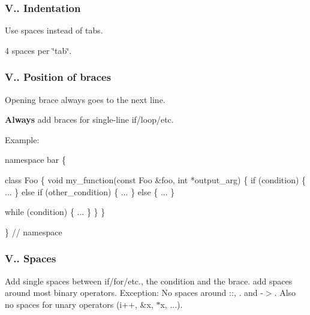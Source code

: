 \subsubsection*{V.. Indentation}


\begin{DoxyItemize}
\item Use spaces instead of tabs.
\item 4 spaces per \char`\"{}tab\char`\"{}.
\end{DoxyItemize}

\subsubsection*{V.. Position of braces}


\begin{DoxyItemize}
\item Opening brace always goes to the next line.
\item {\bfseries Always} add braces for single-\/line if/loop/etc.
\end{DoxyItemize}

Example\+:


\begin{DoxyCode}
\textcolor{keyword}{namespace }bar
\{

\textcolor{keyword}{class }Foo
\{
    \textcolor{keywordtype}{void} my\_function(\textcolor{keyword}{const} Foo &foo, \textcolor{keywordtype}{int} *output\_arg)
    \{
        \textcolor{keywordflow}{if} (condition)
        \{
            ...
        \}
        \textcolor{keywordflow}{else} \textcolor{keywordflow}{if} (other\_condition)
        \{
            ...
        \}
        \textcolor{keywordflow}{else}
        \{
            ...
        \}

        \textcolor{keywordflow}{while} (condition)
        \{
            ...
        \}
    \}
\}

\} \textcolor{comment}{// namespace}
\end{DoxyCode}


\subsubsection*{V.. Spaces}

Add single spaces between if/for/etc., the condition and the brace. add spaces around most binary operators. Exception\+: No spaces around {\ttfamily \+:\+:}, {\ttfamily .} and {\ttfamily -\/$>$}. Also no spaces for unary operators ({\ttfamily i++}, {\ttfamily \&x}, {\ttfamily $\ast$x}, ...).

